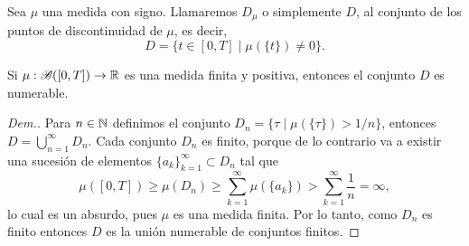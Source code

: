 \begin{defi}
	Sea $\mu$ una medida con signo. Llamaremos $D_{\mu}$ o simplemente $D$, al conjunto de los puntos de discontinuidad  de $\mu$, es decir, 
	$$D=\{t \in [0,T]  \mid  \mu(\{t\})\neq 0\}.$$
\end{defi}


\begin{lem}\label{D numerable}
	Si $\mu:\mathscr{B}([0,T])\to \mathbb{R}$ es una medida finita y positiva, entonces el conjunto $D$ es numerable.
\end{lem}
\begin{proof}[Dem.]
	Para $n\in\mathbb{N}$ definimos el conjunto $D_n=\{\tau\mid\mu(\{\tau\})>1/n\}$, entonces $D=\bigcup_{n=1}^\infty D_n$. Cada conjunto $D_n$ es finito, porque de lo contrario va a existir una sucesión de elementos $\{a_k\}_{k=1}^\infty\subset D_n$ tal que 
	\begin{equation*}
		\mu([0,T])\geq\mu(D_n)\geq\sum_{k=1}^{\infty}\mu(\{a_k\})>\sum_{k=1}^{\infty}\dfrac{1}{n}=\infty,
	\end{equation*}
	lo cual es un absurdo, pues $\mu$ es una medida finita. Por lo tanto, como $D_n$ es finito entonces $D$ es la unión numerable de conjuntos finitos. 
\end{proof}
